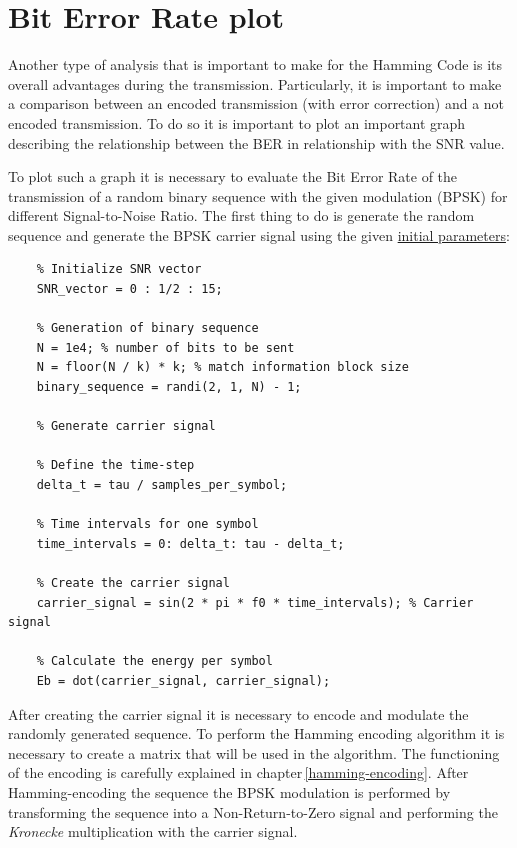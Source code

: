 \vspace{40px}\section{Bit Error Rate plot}
Another type of analysis that is important to make for the Hamming Code is its overall advantages during the transmission. Particularly, it is important to make a comparison between an encoded transmission (with error correction) and a not encoded transmission. To do so it is important to plot an important graph describing the relationship between the BER in relationship with the SNR value.

To plot such a graph it is necessary to evaluate the Bit Error Rate of the transmission of a random binary sequence with the given modulation (BPSK) for different Signal-to-Noise Ratio. The first thing to do is generate the random sequence and generate the BPSK carrier signal using the given \hyperref[initial-parameters]{initial parameters}:

\begin{lstlisting}
    % Initialize SNR vector
    SNR_vector = 0 : 1/2 : 15; 
        
    % Generation of binary sequence
    N = 1e4; % number of bits to be sent
    N = floor(N / k) * k; % match information block size
    binary_sequence = randi(2, 1, N) - 1;
    
    % Generate carrier signal
    
    % Define the time-step
    delta_t = tau / samples_per_symbol;
    
    % Time intervals for one symbol
    time_intervals = 0: delta_t: tau - delta_t;
    
    % Create the carrier signal
    carrier_signal = sin(2 * pi * f0 * time_intervals); % Carrier signal
    
    % Calculate the energy per symbol
    Eb = dot(carrier_signal, carrier_signal);
\end{lstlisting}

\noindent After creating the carrier signal it is necessary to encode and modulate the randomly generated sequence. To perform the Hamming encoding algorithm it is necessary to create a matrix that will be used in the algorithm. The functioning of the encoding is carefully explained in chapter\,\ref{hamming-encoding}. After Hamming-encoding the sequence the BPSK modulation is performed by transforming the sequence into a Non-Return-to-Zero signal and performing the \textit{Kronecke} multiplication with the carrier signal.

